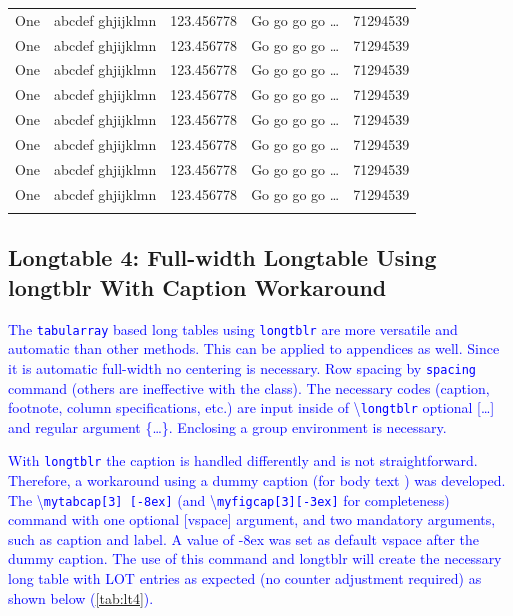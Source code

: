 \documentclass[phd]{ndsu-thesis-2022}
\newcommand\italk[1]{\textcolor{blue}{#1}}  %
\newcommand\cmd[1]{\textbackslash\texttt{#1}}  %
\begin{document}
\begin{longtable}{l l l l r}
One & abcdef ghjijklmn & 123.456778  & Go go go go \ldots & \num{71294539}\\
One & abcdef ghjijklmn & 123.456778  & Go go go go \ldots & \num{71294539}\\
One & abcdef ghjijklmn & 123.456778  & Go go go go \ldots & \num{71294539}\\
One & abcdef ghjijklmn & 123.456778  & Go go go go \ldots & \num{71294539}\\
One & abcdef ghjijklmn & 123.456778  & Go go go go \ldots & \num{71294539}\\
One & abcdef ghjijklmn & 123.456778  & Go go go go \ldots & \num{71294539}\\
One & abcdef ghjijklmn & 123.456778  & Go go go go \ldots & \num{71294539}\\
One & abcdef ghjijklmn & 123.456778  & Go go go go \ldots & \num{71294539}\\
\bottomrule
\label{lt:sim}
\end{longtable}
\endgroup


\subsection{Longtable 4: Full-width Longtable Using longtblr With Caption Workaround}

\italk{The \texttt{tabularray} based long tables using \texttt{longtblr} are more versatile and automatic than other methods. This can be applied to appendices as well. Since it is automatic full-width no centering is necessary. Row spacing by \texttt{spacing} command (others are ineffective with the class). The necessary codes (caption, footnote, column specifications, etc.) are input inside of \cmd{longtblr} optional [\ldots] and regular argument \{\ldots\}. Enclosing a group environment is necessary.} 

\italk{With \texttt{longtblr} the caption is handled differently and is not straightforward. Therefore, a workaround using a dummy caption (for body text ) was developed. The \cmd{mytabcap[3] [-8ex]} (and \cmd{myfigcap[3][-3ex]} for completeness) command with one optional [vspace] argument, and two mandatory arguments, such as caption and label. A value of -8ex was set as default vspace after the dummy caption. The use of this command and longtblr will create the necessary long table with LOT entries as expected (no counter adjustment required) as shown below (\cref{tab:lt4}).}
\end{document}
